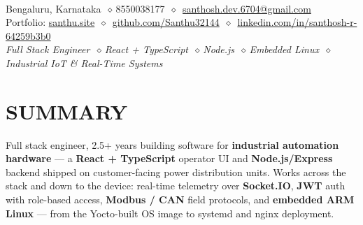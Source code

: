 \documentclass[a4paper,10pt]{article}
\newcommand{\dmnd}{\,{\color{muted}$\diamond$}\,}
\begin{document}
\begin{center}
  {\bfseries\fontsize{18}{21}\selectfont{}}\\[4pt]
  {\fontsize{9.4}{11}\selectfont
   Bengaluru, Karnataka \dmnd 8550038177 \dmnd
   \href{mailto:santhosh.dev.6704@gmail.com}{santhosh.dev.6704@gmail.com}}\\[3pt]
  {\fontsize{9.4}{11}\selectfont
   Portfolio: \href{https://santhu.site}{santhu.site} \dmnd
   \href{https://github.com/Santhu32144}{github.com/Santhu32144} \dmnd
   \href{https://www.linkedin.com/in/santhosh-r-64259b3b0}{linkedin.com/in/santhosh-r-64259b3b0}}\\[3pt]
  {\color{muted}\itshape\fontsize{9.2}{11}\selectfont
   Full Stack Engineer \dmnd React + TypeScript \dmnd Node.js \dmnd Embedded Linux \dmnd
   Industrial IoT \& Real-Time Systems}
\end{center}

\section{SUMMARY}
\noindent Full stack engineer, 2.5+ years building software for \textbf{industrial automation
hardware} --- a \textbf{React + TypeScript} operator UI and \textbf{Node.js/Express} backend
shipped on customer-facing power distribution units. Works across the stack and down to the
device: real-time telemetry over \textbf{Socket.IO}, \textbf{JWT} auth with role-based access,
\textbf{Modbus / CAN} field protocols, and \textbf{embedded ARM Linux} --- from the Yocto-built
OS image to systemd and nginx deployment.

\end{document}
